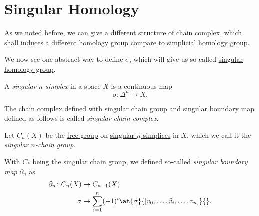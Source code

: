 \section{Singular Homology}
As we noted before, we can give a different structure of \hyperref[def:chain-complex]{chain complex}, which shall
induces a different \hyperref[def:homology-group]{homology group} compare to \hyperref[def:simplicial-homology-group]{simplicial homology group}.

We now see one abstract way to define \(\sigma \), which will give us so-called \hyperref[def:singular-homology-group]{singular homology group}.

\begin{definition}\label{def:singular-simplex}
	A \emph{singular \(n\)-simplex} in a space \(X\) is a continuous map
	\[
		\sigma \colon \Delta^n \to X.
	\]
\end{definition}

\begin{definition}\label{def:singular-chain-complex}
	The \hyperref[def:chain-complex]{chain complex} defined with \hyperref[def:singular-chain-group]{singular chain group} and
	\hyperref[def:singular-boundary-map]{singular boundary map} defined as follows is called \emph{singular chain complex}.
	\begin{definition}\label{def:singular-chain-group}
		Let \(C_n(X)\) be the \hyperref[def:free-group]{free group} on \hyperref[def:singular-simplex]{singular \(n\)-simplices} in \(X\), which we
		call it the \emph{singular \(n\)-chain group}.
	\end{definition}
	\begin{definition}\label{def:singular-boundary-map}
		With \(C_\ast\) being the \hyperref[def:singular-chain-group]{singular chain group}, we defined so-called \emph{singular boundary map} \(\partial _n\) as
		\[
			\begin{split}
				\partial_n \colon C_n(X) & \to C_{n - 1}(X)                                                                      \\
				\sigma                   & \mapsto \sum_{i = 1}^n (-1)^i \at{\sigma}{[v_0, \dots, \widehat{v}_i, \dots, v_n]}{}.
			\end{split}
		\]
	\end{definition}
\end{definition}

